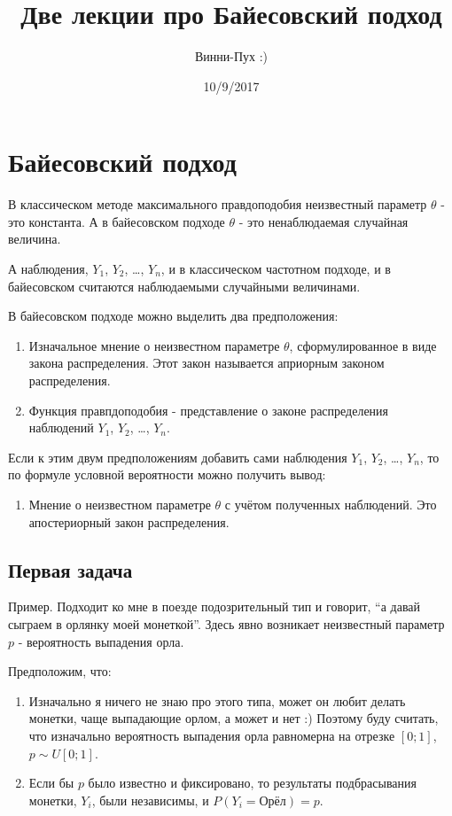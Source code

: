 \documentclass[11pt,russian,]{article}
\title{Две лекции про Байесовский подход}
\author{Винни-Пух :)}
\date{10/9/2017}
\providecommand{\tightlist}{%
  \setlength{\itemsep}{0pt}\setlength{\parskip}{0pt}}
\begin{document}
\maketitle

\section{Байесовский подход}\label{-}

В классическом методе максимального правдоподобия неизвестный параметр
\(\theta\) - это константа. А в байесовском подходе \(\theta\) - это
ненаблюдаемая случайная величина.

А наблюдения, \(Y_1\), \(Y_2\), \ldots, \(Y_n\), и в классическом
частотном подходе, и в байесовском считаются наблюдаемыми случайными
величинами.

В байесовском подходе можно выделить два предположения:

\begin{enumerate}
\def\labelenumi{\arabic{enumi}.}
\item
  Изначальное мнение о неизвестном параметре \(\theta\),
  сформулированное в виде закона распределения. Этот закон называется
  априорным законом распределения.
\item
  Функция правпдоподобия - представление о законе распределения
  наблюдений \(Y_1\), \(Y_2\), \ldots, \(Y_n\).
\end{enumerate}

Если к этим двум предположениям добавить сами наблюдения \(Y_1\),
\(Y_2\), \ldots, \(Y_n\), то по формуле условной вероятности можно
получить вывод:

\begin{enumerate}
\def\labelenumi{\arabic{enumi}.}
\tightlist
\item
  Мнение о неизвестном параметре \(\theta\) с учётом полученных
  наблюдений. Это апостериорный закон распределения.
\end{enumerate}

\subsection{Первая задача}\label{-}

Пример. Подходит ко мне в поезде подозрительный тип и говорит, ``а давай
сыграем в орлянку моей монеткой''. Здесь явно возникает неизвестный
параметр \(p\) - вероятность выпадения орла.

Предположим, что:

\begin{enumerate}
\def\labelenumi{\arabic{enumi}.}
\item
  Изначально я ничего не знаю про этого типа, может он любит делать
  монетки, чаще выпадающие орлом, а может и нет :) Поэтому буду считать,
  что изначально вероятность выпадения орла равномерна на отрезке
  \([0;1]\), \(p \sim U[0;1]\).
\item
  Если бы \(p\) было известно и фиксировано, то результаты подбрасывания
  монетки, \(Y_i\), были независимы, и \(P(Y_i = \text{Орёл})=p\).
\end{enumerate}
\end{document}
